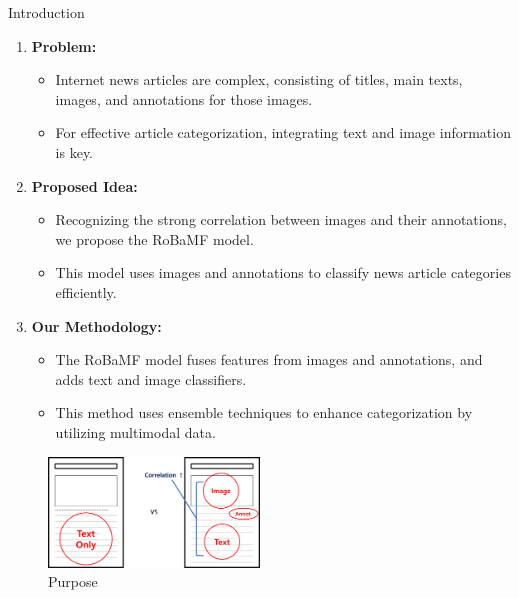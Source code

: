\documentclass[final]{beamer}
\newlength{\colwidth}
\begin{document}
\begin{frame}[t]
\begin{columns}[t]
\begin{column}{\colwidth}
\begin{block}{Introduction}
\begin{enumerate}
        \item \textbf{Problem:}
        \begin{itemize}
            \item Internet news articles are complex, consisting of titles, main texts, images, and annotations for those images.
            \item For effective article categorization, integrating text and image information is key.
        \end{itemize}
        
        \item \textbf{Proposed Idea:}
        \begin{itemize}
            \item Recognizing the strong correlation between images and their annotations, we propose the RoBaMF model.
            \item This model uses images and annotations to classify news article categories efficiently.
        \end{itemize}
        
        \item \textbf{Our Methodology:}
        \begin{itemize}
            \item The RoBaMF model fuses features from images and annotations, and adds text and image classifiers.
            \item This method uses ensemble techniques to enhance categorization by utilizing multimodal data.
        \end{itemize}
    \end{enumerate}



  \end{block}

    \begin{figure}[ht]
    \centering
    \includegraphics[width=0.5\textwidth]{Figure/fig-target.png}
    \caption{Purpose}
    \label{fig:Purpose}
    \end{figure}

    



\end{column}
\end{columns}
\end{frame}
\end{document}
